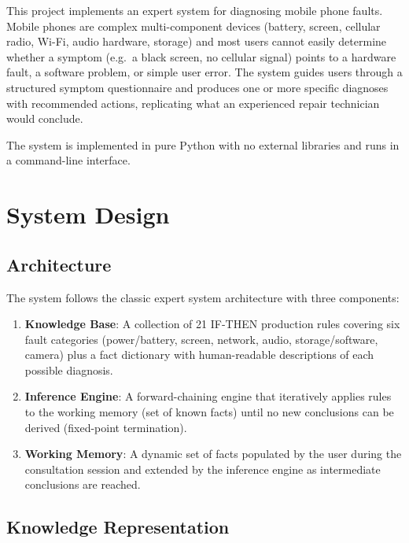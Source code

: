 \documentclass[12pt,a4paper]{article}
\begin{document}
This project implements an expert system for diagnosing mobile phone faults.
Mobile phones are complex multi-component devices (battery, screen, cellular radio,
Wi-Fi, audio hardware, storage) and most users cannot easily determine whether a
symptom (e.g.\ a black screen, no cellular signal) points to a hardware fault,
a software problem, or simple user error. The system guides users through a structured
symptom questionnaire and produces one or more specific diagnoses with recommended
actions, replicating what an experienced repair technician would conclude.

The system is implemented in pure Python with no external libraries and runs in
a command-line interface.

\section{System Design}

\subsection{Architecture}

The system follows the classic expert system architecture with three components:

\begin{enumerate}[leftmargin=*]
    \item \textbf{Knowledge Base}: A collection of 21 IF-THEN production rules covering
          six fault categories (power/battery, screen, network, audio, storage/software,
          camera) plus a fact dictionary with human-readable descriptions of each
          possible diagnosis.

    \item \textbf{Inference Engine}: A forward-chaining engine that iteratively
          applies rules to the working memory (set of known facts) until no new
          conclusions can be derived (fixed-point termination).

    \item \textbf{Working Memory}: A dynamic set of facts populated by the user
          during the consultation session and extended by the inference engine as
          intermediate conclusions are reached.
\end{enumerate}

\subsection{Knowledge Representation}
\end{document}
